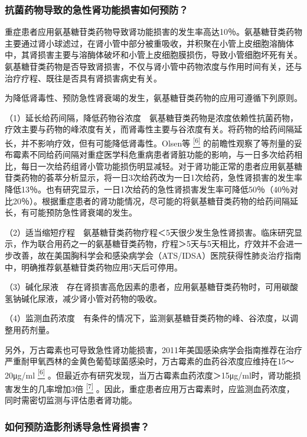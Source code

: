 \subsubsection{抗菌药物导致的急性肾功能损害如何预防？}

重症患者应用氨基糖苷类药物导致肾功能损害的发生率高达10％。氨基糖苷类药物主要通过肾小球滤过，在肾小管中部分被重吸收，并积聚在小管上皮细胞溶酶体中，其肾损害主要与溶酶体破坏和小管上皮细胞膜损伤，导致小管细胞坏死有关。氨基糖苷类药物是否导致肾损害，不仅与肾小管中药物浓度与作用时间有关，还与治疗疗程、既往是否具有肾损害病史有关。

为降低肾毒性、预防急性肾衰竭的发生，氨基糖苷类药物的应用可遵循下列原则。

（1）延长给药间隔，降低药物谷浓度　氨基糖苷类药物是浓度依赖性抗菌药物，疗效主要与药物的峰浓度有关，而肾毒性主要与谷浓度有关。将药物的给药间隔延长，并不影响疗效，但有可能降低肾毒性。Olsen等
\protect\hyperlink{text00017.htmlux5cux23ch6-16}{\textsuperscript{{[}6{]}}}
的前瞻性观察了等剂量的妥布霉素不同给药间隔对重症医学科危重病患者肾脏功能的影响，与一日多次给药相比，每日一次给药组肾小管功能损伤明显减轻。对于肾功能正常的患者应用氨基糖苷类药物的荟萃分析显示，将一日3次给药改为一日1次给药，急性肾损害的发生率降低13％。也有研究显示，一日1次给药的急性肾损害发生率可降低50％（40％对比20％）。根据重症患者的肾功能情况，尽可能的将氨基糖苷类药物的给药间隔延长，有可能预防急性肾衰竭的发生。

（2）适当缩短疗程　氨基糖苷类药物疗程＜5天很少发生急性肾损害。临床研究显示，作为联合用药之一的氨基糖苷类药物，疗程＞5天与5天相比，疗效并不会进一步改善，故在美国胸科学会和感染病学会（ATS/IDSA）医院获得性肺炎治疗指南中，明确推荐氨基糖苷类药物应用5天后可停用。

（3）碱化尿液　存在肾损害高危因素的患者，应用氨基糖苷类药物时，可用碳酸氢钠碱化尿液，减少肾小管对药物的吸收。

（4）监测血药浓度　有条件的情况下，监测氨基糖苷类药物的峰、谷浓度，以调整用药剂量。

另外，万古霉素也可导致急性肾功能损害，2011年美国感染病学会指南推荐在治疗严重耐甲氧西林的金黄色葡萄球菌感染时，万古霉素的血药谷浓度应维持在15～20μg/ml
\protect\hyperlink{text00017.htmlux5cux23ch6-16}{\textsuperscript{{[}6{]}}}
。但最近亦有研究发现，当万古霉素血药浓度＞15μg/ml时，肾功能损害发生的几率增加3倍
\protect\hyperlink{text00017.htmlux5cux23ch7-16}{\textsuperscript{{[}7{]}}}
。因此，重症患者应用万古霉素时，应监测血药浓度，同时需密切监测与评估患者肾功能。

\subsubsection{如何预防造影剂诱导急性肾损害？}

